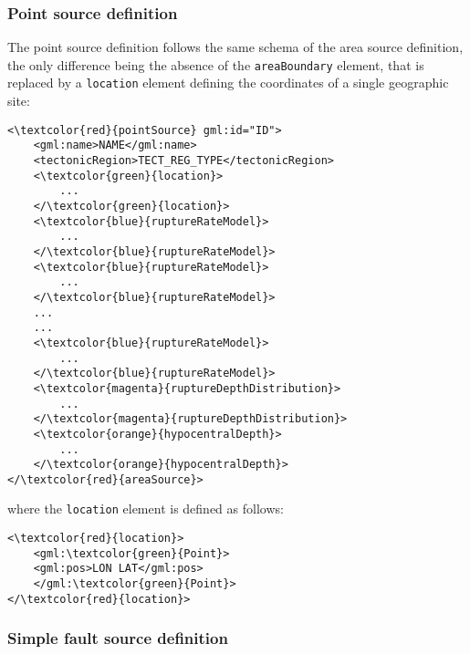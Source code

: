 \subsubsection{Point source definition}
The point source definition follows the same schema of the area source definition, the only
difference being the absence of the \Verb+areaBoundary+ element, that is replaced by a
\Verb+location+ element defining the coordinates of a single geographic site:
\begin{Verbatim}[frame=single, commandchars=\\\{\},fontsize=\normalsize, samepage=true]
<\textcolor{red}{pointSource} gml:id="ID">
	<gml:name>NAME</gml:name>
	<tectonicRegion>TECT_REG_TYPE</tectonicRegion>
	<\textcolor{green}{location}>
		...
	</\textcolor{green}{location}>
	<\textcolor{blue}{ruptureRateModel}>
		...
	</\textcolor{blue}{ruptureRateModel}>
	<\textcolor{blue}{ruptureRateModel}>
		...
	</\textcolor{blue}{ruptureRateModel}>
	...
	...
	<\textcolor{blue}{ruptureRateModel}>
		...
	</\textcolor{blue}{ruptureRateModel}>
	<\textcolor{magenta}{ruptureDepthDistribution}>
		...
	</\textcolor{magenta}{ruptureDepthDistribution}>
	<\textcolor{orange}{hypocentralDepth}>
		...	
	</\textcolor{orange}{hypocentralDepth}>
</\textcolor{red}{areaSource}>
\end{Verbatim}
where the \Verb+location+ element is defined as follows:
\begin{Verbatim}[frame=single, commandchars=\\\{\},fontsize=\normalsize, samepage=true]
<\textcolor{red}{location}>
	<gml:\textcolor{green}{Point}>
	<gml:pos>LON LAT</gml:pos>
	</gml:\textcolor{green}{Point}>
</\textcolor{red}{location}>
\end{Verbatim}

\subsubsection{Simple fault source definition}


